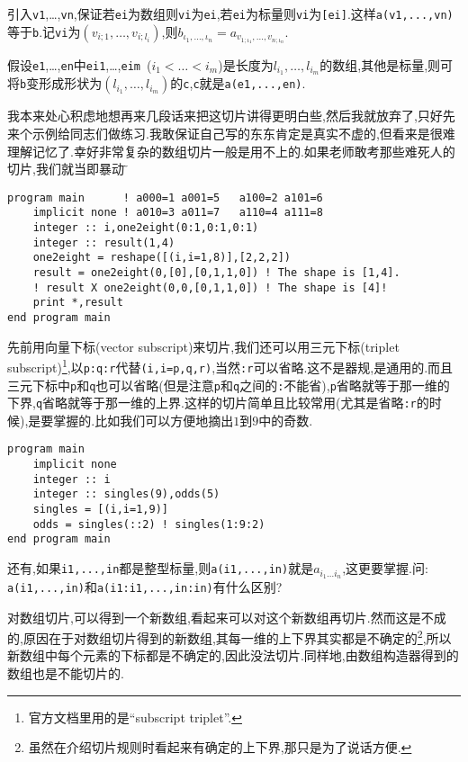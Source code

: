 引入\texttt{v1},\dots,\texttt{vn},保证若\texttt{ei}为数组则\texttt{vi}为\texttt{ei},若\texttt{ei}为标量则\texttt{vi}为\texttt{[ei]}.这样\texttt{a(v1,...,vn)}等于\texttt{b}.记\texttt{vi}为$(v_{i;1},\dots,v_{i;{l_i}})$,则$b_{{\iota_1},\dots,{\iota_n}}=a_{{v_{1;\iota_1}},\dots,{v_{n;\iota_n}}}$.

假设\texttt{e1},\dots,\texttt{en}中\texttt{ei1},\dots,\texttt{eim}\ ($i_1\!<\!\dots\!<\!i_m$)是长度为$l_{i_1},\dots,l_{i_m}$的数组,其他是标量,则可将\texttt{b}变形成形状为$(l_{i_1},\dots,l_{i_m})$的\texttt{c},\texttt{c}就是\texttt{a(e1,...,en)}.

我本来处心积虑地想再来几段话来把这切片讲得更明白些,然后我就放弃了,只好先来个示例给同志们做练习.我敢保证自己写的东东肯定是真实不虚的,但看来是很难理解记忆了.幸好非常复杂的数组切片一般是用不上的.如果老师敢考那些难死人的切片,我们就当即暴动$\!\text{\~{}}$
\begin{lstlisting}
program main      ! a000=1 a001=5   a100=2 a101=6
    implicit none ! a010=3 a011=7   a110=4 a111=8
    integer :: i,one2eight(0:1,0:1,0:1)
    integer :: result(1,4)
    one2eight = reshape([(i,i=1,8)],[2,2,2])
    result = one2eight(0,[0],[0,1,1,0]) ! The shape is [1,4].
    ! result X one2eight(0,0,[0,1,1,0]) ! The shape is [4]!
    print *,result
end program main
\end{lstlisting}

先前用向量下标(vector subscript)来切片,我们还可以用三元下标(triplet subscript)\footnote{
官方文档里用的是``subscript triplet''.
},以\texttt{p:q:r}代替\texttt{(i,i=p,q,r)},当然\texttt{:r}可以省略.这不是器规,是通用的.而且三元下标中\texttt{p}和\texttt{q}也可以省略(但是注意\texttt{p}和\texttt{q}之间的\texttt{:}不能省),\texttt{p}省略就等于那一维的下界,\texttt{q}省略就等于那一维的上界.这样的切片简单且比较常用(尤其是省略\texttt{:r}的时候),是要掌握的.比如我们可以方便地摘出$1$到$9$中的奇数.
\begin{lstlisting}
program main
    implicit none
    integer :: i
    integer :: singles(9),odds(5)
    singles = [(i,i=1,9)]
    odds = singles(::2) ! singles(1:9:2)
end program main
\end{lstlisting}
还有,如果\texttt{i1,...,in}都是整型标量,则\texttt{a(i1,...,in)}就是$a_{i_1\dots i_n}$,这更要掌握.问: \texttt{a(i1,...,in)}和\texttt{a(i1:i1,...,in:in)}有什么区别?

对数组切片,可以得到一个新数组,看起来可以对这个新数组再切片.然而这是不成的,原因在于对数组切片得到的新数组,其每一维的上下界其实都是不确定的\footnote{
虽然在介绍切片规则时看起来有确定的上下界,那只是为了说话方便.
},所以新数组中每个元素的下标都是不确定的,因此没法切片.同样地,由数组构造器得到的数组也是不能切片的.

